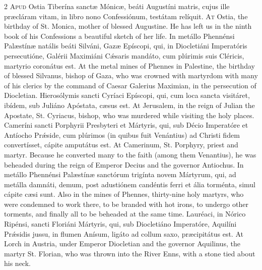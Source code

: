 \begin{paracol}{2}
\lettrine[lines=2]{A}{pud} Ostia Tiberína 
 sanctæ Mónicæ, beáti Augustíni matris, cujus ille præcláram vitam, in libro 
 nono Confessiónum, testátam relíquit.
\switchcolumn
{}
\lettrine[lines=2]{A}{t} Ostia, the birthday of St. 
 Monica, mother of blessed Augustine. He has left us in the ninth book 
 of his Confessions a beautiful sketch of her life.
\switchcolumn*
{}
In metállo Phennénsi 
 Palæstínæ natális beáti Silváni, Gazæ Epíscopi, qui, in Diocletiáni 
 Imperatóris persecutióne, Galérii Maximiáni Cǽsaris mandáto, cum plúrimis 
 suis Cléricis, martyrio coronátus est.
\switchcolumn
{}
At the metal mines of Phennes in 
 Palestine, the birthday of blessed Silvanus, bishop of Gaza, who was crowned 
 with martyrdom with many of his clerics by the command of Caesar Galerius 
 Maximian, in the persecution of Diocletian.
\switchcolumn*
{}
Hierosólymis sancti 
 Cyríaci Epíscopi, qui, cum loca sancta visitáret, ibídem, sub Juliáno 
 Apóstata, cæsus est.
\switchcolumn
{}
At Jerusalem, in the reign of 
 Julian the Apostate, St. Cyriacus, bishop, who was murdered while visiting 
 the holy places.
\switchcolumn*
{}
Cameríni sancti 
 Porphyrii Presbyteri et Mártyris, qui, sub Décio Imperatóre et Antíocho 
 Prǽside, cum plúrimos (in quibus fuit Venántius) ad Christi fidem 
 convertísset, cápite amputátus est.
\switchcolumn
{}
At Camerinum, St. Porphyry, priest 
 and martyr. Because he converted many to the faith (among them 
 Venantius), he was beheaded during the reign of Emperor Decius and the 
 governor Antiochus.
\switchcolumn*
{}
In metállo Phennénsi 
 Palæstínæ sanctórum trigínta novem Mártyrum, qui, ad metálla damnáti, demum, 
 post adustiónem candéntis ferri et ália torménta, simul cápite cæsi sunt.
\switchcolumn
{}
Also in the mines of Phennes, 
 thirty-nine holy martyrs, who were condemned to work there, to be branded 
 with hot irons, to undergo other torments, and finally all to be beheaded at 
 the same time.
\switchcolumn*
{}
Lauréaci, in Nórico 
 Ripénsi, sancti Floriáni Mártyris, qui, sub Diocletiáno Imperatóre, Aquilíni 
 Prǽsidis jussu, in flumen Anísum, ligáto ad collum saxo, præcipitátus est.
\switchcolumn
{}
At Lorch in Austria, under Emperor 
 Diocletian and the governor Aquilinus, the martyr St. Florian, who was 
 thrown into the River Enns, with a stone tied about his neck.

\end{paracol}
